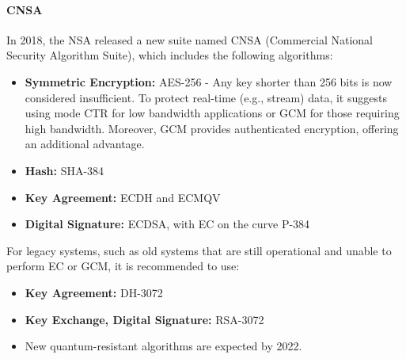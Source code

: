 \paragraph{CNSA}
In 2018, the NSA released a new suite named CNSA (Commercial National Security Algorithm Suite), which includes the following algorithms:
\begin{itemize}
    \item \textbf{Symmetric Encryption:} AES-256 - Any key shorter than 256 bits is now considered insufficient. To protect real-time (e.g., stream) data, it suggests using mode CTR for low bandwidth applications or GCM for those requiring high bandwidth. Moreover, GCM provides authenticated encryption, offering an additional advantage.
    \item \textbf{Hash:} SHA-384
    \item \textbf{Key Agreement:} ECDH and ECMQV
    \item \textbf{Digital Signature:} ECDSA, with EC on the curve P-384
\end{itemize}
For legacy systems, such as old systems that are still operational and unable to perform EC or GCM, it is recommended to use:
\begin{itemize}
    \item \textbf{Key Agreement:} DH-3072
    \item \textbf{Key Exchange, Digital Signature:} RSA-3072
    \item New quantum-resistant algorithms are expected by 2022.
\end{itemize}

